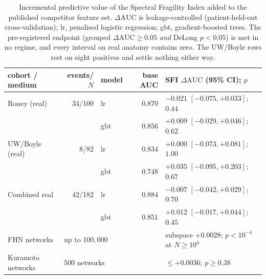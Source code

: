 \documentclass[11pt]{article}
\newcommand{\dAUC}{\ensuremath{\Delta\mathrm{AUC}}}
\begin{document}
\newpage
\begin{table}[H]
\centering
\caption{Incremental predictive value of the Spectral Fragility Index added to
the published competitor feature set. $\dAUC$ is leakage-controlled
(patient-held-out cross-validation); lr, penalised logistic regression; gbt,
gradient-boosted trees. The pre-registered endpoint (grouped $\dAUC\geq0.05$
\emph{and} DeLong $p<0.05$) is met in no regime, and every interval on real
anatomy contains zero. The UW/Boyle rows rest on eight positives and settle
nothing either way.}
\label{tab:primary}
\footnotesize
\begin{tabularx}{\linewidth}{@{}l r l r X@{}}
\toprule
cohort / medium & events/$N$ & model & base AUC & SFI $\dAUC$ (95\% CI); $p$ \\
\midrule
Roney (real)      & 34/100 & lr  & $0.870$ & $-0.021$ $[-0.075,+0.033]$; $0.44$ \\
                  &        & gbt & $0.856$ & $+0.009$ $[-0.029,+0.046]$; $0.62$ \\
UW/Boyle (real)   & 8/82   & lr  & $0.834$ & $+0.000$ $[-0.073,+0.081]$; $1.00$ \\
                  &        & gbt & $0.748$ & $+0.035$ $[-0.095,+0.203]$; $0.67$ \\
Combined real     & 42/182 & lr  & $0.884$ & $-0.007$ $[-0.042,+0.029]$; $0.70$ \\
                  &        & gbt & $0.851$ & $+0.012$ $[-0.017,+0.044]$; $0.45$ \\
\midrule
FHN networks      & \multicolumn{3}{l}{up to $100{,}000$}  & subspace $+0.0028$;
$p<10^{-4}$ at $N\geq10^4$ \\
Kuramoto networks & \multicolumn{3}{l}{$500$ networks}     & $\leq +0.0036$;
$p\geq0.38$ \\
\bottomrule
\end{tabularx}
\end{table}
\end{document}
